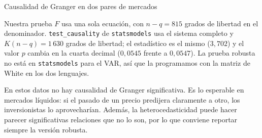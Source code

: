 \begin{ejresuelto}{Causalidad de Granger en dos pares de mercados}

\RvsPy Nuestra prueba $F$ usa una sola ecuación, con $n-q=815$ grados de libertad en el denominador.
\texttt{test\_causality} de \texttt{statsmodels} usa el sistema completo y $K(n-q)=1\,630$ grados de libertad;
el estadístico es el mismo ($3{,}702$) y el valor $p$ cambia en la cuarta decimal ($0{,}0545$ frente a
$0{,}0547$). La prueba robusta no está en \texttt{statsmodels} para el VAR, así que la programamos con la matriz
de White en los dos lenguajes.

\begin{conclusion}
En estos datos no hay causalidad de Granger significativa. Es lo esperable en mercados líquidos: si el pasado de
un precio predijera claramente a otro, los inversionistas lo aprovecharían. Además, la heterocedasticidad
puede hacer parecer significativas relaciones que no lo son, por lo que conviene reportar siempre la versión
robusta.
\end{conclusion}
\end{ejresuelto}

